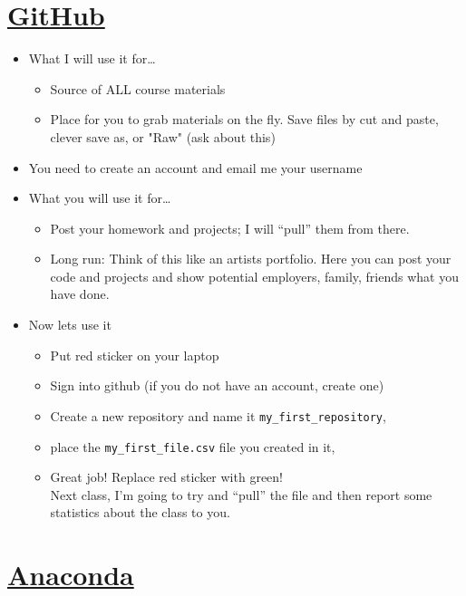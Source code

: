 \section*{\href{https://github.com}{GitHub}}
\begin{itemize}
\item What I will use it for\ldots
\begin{itemize}
\item Source of ALL course materials
\item Place for you to grab materials on the fly. Save files by cut and paste, clever save as, or "Raw" (ask about this)
\end{itemize}
\item You need to create an account and email me your username
\item What you will use it for\ldots
\begin{itemize}
\item Post your homework and projects; I will ``pull'' them from there.
\item Long run: Think of this like an artists portfolio. Here you can post your code and projects and show potential employers, family, friends what you have done.
\end{itemize}
\item Now lets use it
\begin{itemize}
\item Put red sticker on your laptop
\item Sign into github (if you do not have an account, create one)
\item Create a new repository and name it \verb|my_first_repository|,
\item place the \verb|my_first_file.csv| file you created in it,
\item Great job! Replace red sticker with green!\\
Next class, I'm going to try and ``pull'' the file and then report some statistics about the class to you.
\end{itemize}
\end{itemize}


\section*{\href{https://www.anaconda.com/download/}{Anaconda}}

